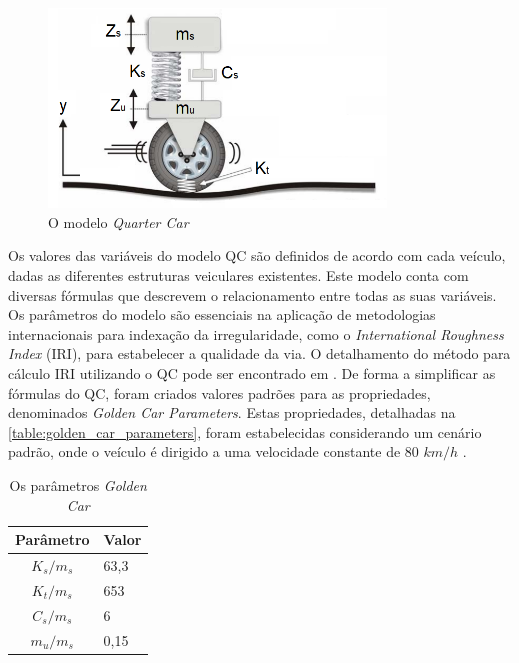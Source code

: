 \begin{figure}[h]
  \centering
  \caption{O modelo \textit{Quarter Car}}
   \label{fig:quarter_car}
   \includegraphics[width=0.8\textwidth]{figuras/fig_4.png}
\end{figure}

Os valores das variáveis do modelo QC são definidos de acordo com cada veículo, dadas as diferentes estruturas veiculares existentes. Este modelo conta com diversas fórmulas que descrevem o relacionamento entre todas as suas variáveis. Os parâmetros do modelo são essenciais na aplicação de metodologias internacionais para indexação da irregularidade, como o \textit{International Roughness Index} (IRI), para estabelecer a qualidade da via. O detalhamento do método para cálculo IRI utilizando o QC pode ser encontrado em . De forma a simplificar as fórmulas do QC, foram criados valores padrões para as propriedades, denominados \textit{Golden Car Parameters}. Estas propriedades, detalhadas na \autoref{table:golden_car_parameters}, foram estabelecidas considerando um cenário padrão, onde o veículo é dirigido a uma velocidade constante de 80 $km/h$ \cite{Loizos2008}.

\begin{table}[h]
    \caption{Os parâmetros \textit{Golden Car}}
    \label{table:golden_car_parameters}
    \centering
    \small
    \begin{tabular}{cl}
        \toprule
        \textbf{Parâmetro} & \textbf{Valor} \\
        \toprule
        $K_s/m_s$ & 63,3 \\
        \midrule
        $K_t/m_s$ & 653 \\
        \midrule
        $C_s/m_s$ & 6 \\
        \midrule
        $m_u/m_s$ & 0,15 \\
        \bottomrule
    \end{tabular}
\end{table}

